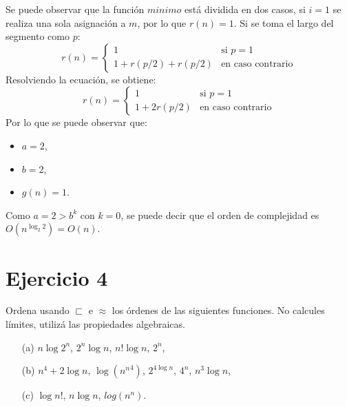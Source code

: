 Se puede observar que la función $minimo$ está dividida en dos casos, si $i = 1$ se realiza una sola asignación a $m$, por lo que $r(n) = 1$. Si se toma el largo del segmento como $p$:
\begin{equation*}
    r(n) = 
    \begin{cases}
        1 & \text{si } p = 1 \\
        1 + r(p/2) + r(p/2) & \text{en caso contrario}
    \end{cases}
\end{equation*}
Resolviendo la ecuación, se obtiene:
\begin{equation*}
    r(n) = 
    \begin{cases}
        1 & \text{si } p = 1 \\
        1 + 2r(p/2) & \text{en caso contrario}
    \end{cases}
\end{equation*}
Por lo que se puede observar que:
\begin{itemize}
    \item $a = 2$,
    \item $b = 2$,
    \item $g(n) = 1$.   
\end{itemize}
Como $a = 2 > b^k$ con $k = 0$, se puede decir que el orden de complejidad es $O(n^{\log_2 2}) = O(n)$.

\section{Ejercicio 4}
Ordena usando $\sqsubset$ e $\approx$ los órdenes de las siguientes funciones. No calcules límites, utilizá las propiedades algebraicas.

\begin{itemize}
    \item[(a)] $n \log 2^n$, $2^n \log n$, $n! \log n$, $2^n$,
    \item[(b)] $n^4+2 \log n$, $\log ({n^n}^4)$, $2^{4 \log n}$, $4^n$, $n^3 \log n$,
    \item[(c)] $\log n!$, $n \log n$, $log(n^n)$.
\end{itemize}

